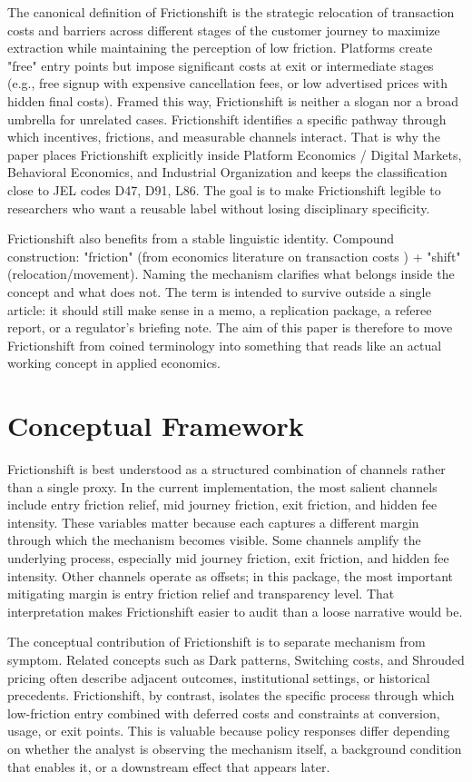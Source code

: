 \documentclass[12pt]{article}
\begin{document}
The canonical definition of Frictionshift is the strategic relocation of transaction costs and barriers across different stages of the customer journey to maximize extraction while maintaining the perception of low friction. Platforms create "free" entry points but impose significant costs at exit or intermediate stages (e.g., free signup with expensive cancellation fees, or low advertised prices with hidden final costs). Framed this way, Frictionshift is neither a slogan nor a broad umbrella for unrelated cases. Frictionshift identifies a specific pathway through which incentives, frictions, and measurable channels interact. That is why the paper places Frictionshift explicitly inside Platform Economics / Digital Markets, Behavioral Economics, and Industrial Organization and keeps the classification close to JEL codes D47, D91, L86. The goal is to make Frictionshift legible to researchers who want a reusable label without losing disciplinary specificity.

Frictionshift also benefits from a stable linguistic identity. Compound construction: "friction" (from economics literature on transaction costs ) + "shift" (relocation/movement). Naming the mechanism clarifies what belongs inside the concept and what does not. The term is intended to survive outside a single article: it should still make sense in a memo, a replication package, a referee report, or a regulator's briefing note. The aim of this paper is therefore to move Frictionshift from coined terminology into something that reads like an actual working concept in applied economics.

\section{Conceptual Framework}
Frictionshift is best understood as a structured combination of channels rather than a single proxy. In the current implementation, the most salient channels include entry friction relief, mid journey friction, exit friction, and hidden fee intensity. These variables matter because each captures a different margin through which the mechanism becomes visible. Some channels amplify the underlying process, especially mid journey friction, exit friction, and hidden fee intensity. Other channels operate as offsets; in this package, the most important mitigating margin is entry friction relief and transparency level. That interpretation makes Frictionshift easier to audit than a loose narrative would be.

The conceptual contribution of Frictionshift is to separate mechanism from symptom. Related concepts such as Dark patterns, Switching costs, and Shrouded pricing often describe adjacent outcomes, institutional settings, or historical precedents. Frictionshift, by contrast, isolates the specific process through which low-friction entry combined with deferred costs and constraints at conversion, usage, or exit points. This is valuable because policy responses differ depending on whether the analyst is observing the mechanism itself, a background condition that enables it, or a downstream effect that appears later.
\end{document}
